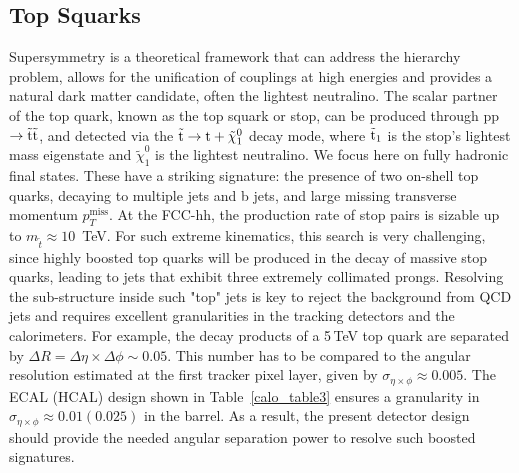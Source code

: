 \documentclass[11pt,twoside,a4paper]{cernrep}
\begin{document}
\subsection{Top Squarks}
Supersymmetry is a theoretical framework that can address the hierarchy problem, allows for the unification of couplings at high energies and provides a natural dark matter candidate, often the lightest neutralino.%
The scalar partner of the top quark, known as the top squark or stop, can be produced through pp$\rightarrow \tilde{\rm t} \tilde{\rm t}$, and detected via the $\rm \tilde{t} \rightarrow t + \tilde{\chi}_1^{0}$ decay mode, where $\rm \tilde{t}_{1}$ is the stop's lightest mass eigenstate and $\tilde{\chi}_1^{0}$ is the lightest neutralino.%
We focus here on fully hadronic final states. These have a striking signature: the presence of two on-shell top quarks, decaying to multiple jets and b jets, and large missing transverse momentum $p_T^{\mathrm{miss}}$. At the FCC-hh, the production rate of stop pairs is sizable up to $m_{\tilde{t}} \approx 10$~TeV. For such extreme kinematics, this search is very challenging, since highly boosted top quarks will be produced in the decay of massive stop quarks, leading to jets that exhibit three extremely collimated prongs. Resolving the sub-structure inside such "top" jets is key to reject the background from QCD jets and requires excellent granularities in the tracking detectors and the calorimeters. For example, the decay products of a 5\,TeV top quark are separated by $\Delta R {=} \Delta \eta \times \Delta \phi \sim 0.05$. This number has to be compared to the angular resolution estimated at the first tracker pixel layer, given by $\sigma_{\eta \times \phi} \approx 0.005$. The ECAL (HCAL) design shown in Table~\ref{calo_table3} ensures a granularity in $\sigma_{\eta \times \phi} \approx 0.01 (0.025)$ in the barrel. As a result, the present detector design should provide the needed angular separation power to resolve such boosted signatures.
\end{document}
